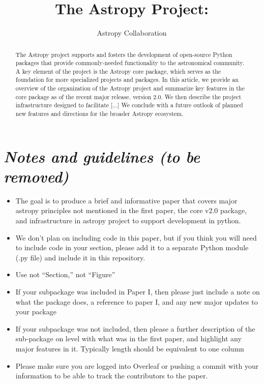 \documentclass[modern]{aastex61}
\newcommand{\escapecmd}[1]{\texttt{\detokenize{#1}}}
\begin{document}
\draft{\today}

\title{The Astropy Project: }


\author{Astropy Collaboration}

\begin{abstract}
The Astropy project supports and fosters the development of open-source Python
packages that provide commonly-needed functionality to the astronomical
community.
A key element of the project is the Astropy core package, which serves as the
foundation for more specialized projects and packages.
In this article, we provide an overview of the organization of the Astropy
project and summarize key features in the core package as of the recent major
release, version 2.0.
We then describe the project infrastructure designed to facilitate [...]
We conclude with a future outlook of planned new features and directions for the
broader Astropy ecosystem.
\end{abstract}

\keywords{}

\section*{\textit{Notes and guidelines (to be removed)}}

\begin{itemize}
   \item The goal is to produce a brief and informative paper that covers major astropy principles not mentioned in the first paper, the core v2.0 package, and infrastructure in astropy project to support development in python.
	\item We don't plan on including code in this paper, but if you think you will need to include code in your section, please add it to a separate Python module (.py file) and include it in this repository.
    \item Use \escapecmd{\sectionname} not ``Section,'' \escapecmd{\figurename} not ``Figure''
    \item If your subpackage was included in Paper I, then please just include a note on what the package does, a reference to paper I, and any new major updates to your package
    \item If your subpackage was not included, then please a further description of the sub-package on level with what was in the first paper, and highlight any major features in it.   Typically length should be equivalent to one column
    \item Please make sure you are logged into Overleaf or pushing a commit with your information to be able to track the contributors to the paper.

\end{itemize}
\end{document}
